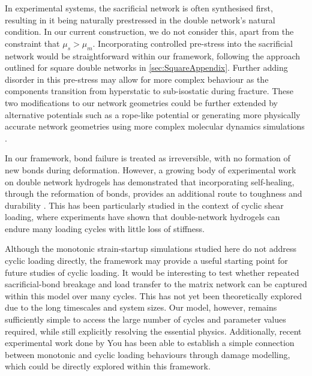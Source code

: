 \documentclass[asymmetricmargins]{library/duthesis}%
\begin{document}
In experimental systems, the sacrificial network is often synthesised first, resulting in it being naturally prestressed in the double network's natural condition. In our current construction, we do not consider this, apart from the constraint that $\mu_s > \mu_m$. Incorporating controlled pre-stress into the sacrificial network would be straightforward within our framework, following the approach outlined for square double networks in \cref{sec:SquareAppendix}. Further adding disorder in this pre-stress may allow for more complex behaviour as the components transition from hyperstatic to sub-isostatic during fracture. These two modifications to our network geometries could be further extended by alternative potentials such as a rope-like potential \cite{arzashStressstabilizedSubisostaticFiber2019a} or generating more physically accurate network geometries using more complex molecular dynamics simulations \cite{mugnaiInterspeciesInteractionsDual2025,rijns_synthetic_2024}.  

In our framework, bond failure is treated as irreversible, with no formation of new bonds during deformation. However, a growing body of experimental work on double network hydrogels has demonstrated that incorporating self-healing, through the reformation of bonds, provides an additional route to toughness and durability \cite{wangRapidSelfstrengtheningDoublenetwork2025,yasuiRateIndependentSelfHealingDouble2022,yinSelfHealingHydrogelsSynthesis2023}. This has been particularly studied in the context of cyclic shear loading, where experiments \cite{zhang_fatigue_2018, chen_improvement_2016, chen_novel_2015} have shown that double-network hydrogels can endure many loading cycles with little loss of stiffness. 

Although the monotonic strain-startup simulations studied here do not address cyclic loading directly, the framework may provide a useful starting point for future studies of cyclic loading. It would be interesting to test whether repeated sacrificial-bond breakage and load transfer to the matrix network can be captured within this model over many cycles. This has not yet been theoretically explored due to the long timescales and system sizes. Our model, however, remains sufficiently simple to access the large number of cycles and parameter values required, while still explicitly resolving the essential physics. Additionally, recent experimental work done by You \etal \cite{you_damage_2025} has been able to establish a simple connection between monotonic and cyclic loading behaviours through damage modelling, which could be directly explored within this framework.
\end{document}
